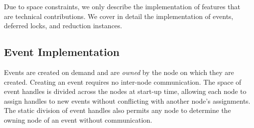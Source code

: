 Due to space constraints, we only describe the implementation of features
that are technical contributions.  We cover in detail
the implementation of events, deferred locks, and reduction instances.

\subsection{Event Implementation}
\label{subsec:eventimpl}

Events are created on demand and are {\em owned} by the node on which they
are created.  Creating an event requires no inter-node communication.
The space of event
handles is divided across the nodes at start-up time, allowing each node to assign handles
to new events without conflicting with another node's assignments.  The static division
of event handles also permits any node to determine the owning node of an event
without communication.

